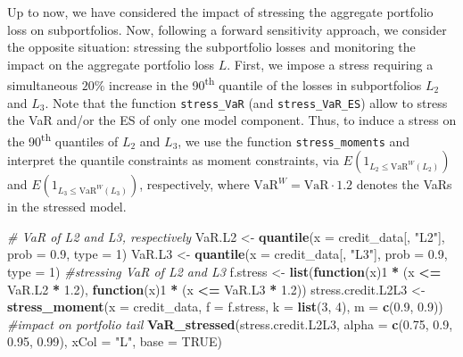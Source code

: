\documentclass[
]{article}
\newenvironment{Shaded}{\begin{snugshade}}{\end{snugshade}}
\newcommand{\CommentTok}[1]{\textcolor[rgb]{0.56,0.35,0.01}{\textit{#1}}}
\newcommand{\ControlFlowTok}[1]{\textcolor[rgb]{0.13,0.29,0.53}{\textbf{#1}}}
\newcommand{\DataTypeTok}[1]{\textcolor[rgb]{0.13,0.29,0.53}{#1}}
\newcommand{\DecValTok}[1]{\textcolor[rgb]{0.00,0.00,0.81}{#1}}
\newcommand{\FloatTok}[1]{\textcolor[rgb]{0.00,0.00,0.81}{#1}}
\newcommand{\KeywordTok}[1]{\textcolor[rgb]{0.13,0.29,0.53}{\textbf{#1}}}
\newcommand{\NormalTok}[1]{#1}
\newcommand{\OperatorTok}[1]{\textcolor[rgb]{0.81,0.36,0.00}{\textbf{#1}}}
\newcommand{\OtherTok}[1]{\textcolor[rgb]{0.56,0.35,0.01}{#1}}
\newcommand{\StringTok}[1]{\textcolor[rgb]{0.31,0.60,0.02}{#1}}
\begin{document}
Up to now, we have considered the impact of stressing the aggregate portfolio loss on subportfolios. Now, following a forward sensitivity approach, we consider the opposite situation: stressing the subportfolio losses and monitoring the impact on the aggregate portfolio loss \(L\). First, we impose a stress requiring a simultaneous \(20\%\) increase in the 90\textsuperscript{th} quantile of the losses in subportfolios \(L_2\) and \(L_3\). Note that the function \texttt{stress\_VaR} (and \texttt{stress\_VaR\_ES}) allow to stress the VaR and/or the ES of only one model component. Thus, to induce a stress on the 90\textsuperscript{th} quantiles of \(L_2\) and \(L_3\), we use the function \texttt{stress\_moments} and interpret the quantile constraints as moment constraints, via \(E(1_{L_2 \leq \text{VaR}^W(L_2)})\) and \(E(1_{L_3 \leq \text{VaR}^W(L_3)})\), respectively, where \(\text{VaR}^W = \text{VaR} \cdot 1.2\) denotes the VaRs in the stressed model.

\begin{Shaded}
\begin{Highlighting}[]
\CommentTok{\# VaR of L2 and L3, respectively}
\NormalTok{VaR.L2 \textless{}{-}}\StringTok{ }\KeywordTok{quantile}\NormalTok{(}\DataTypeTok{x =}\NormalTok{ credit\_data[, }\StringTok{"L2"}\NormalTok{], }\DataTypeTok{prob =} \FloatTok{0.9}\NormalTok{, }\DataTypeTok{type =} \DecValTok{1}\NormalTok{) }
\NormalTok{VaR.L3 \textless{}{-}}\StringTok{ }\KeywordTok{quantile}\NormalTok{(}\DataTypeTok{x =}\NormalTok{ credit\_data[, }\StringTok{"L3"}\NormalTok{], }\DataTypeTok{prob =} \FloatTok{0.9}\NormalTok{, }\DataTypeTok{type =} \DecValTok{1}\NormalTok{) }
\CommentTok{\#stressing VaR of L2 and L3}
\NormalTok{f.stress \textless{}{-}}\StringTok{ }\KeywordTok{list}\NormalTok{(}\ControlFlowTok{function}\NormalTok{(x)}\DecValTok{1} \OperatorTok{*}\StringTok{ }\NormalTok{(x }\OperatorTok{\textless{}=}\StringTok{ }\NormalTok{VaR.L2 }\OperatorTok{*}\StringTok{ }\FloatTok{1.2}\NormalTok{), }
                 \ControlFlowTok{function}\NormalTok{(x)}\DecValTok{1} \OperatorTok{*}\StringTok{ }\NormalTok{(x }\OperatorTok{\textless{}=}\StringTok{ }\NormalTok{VaR.L3 }\OperatorTok{*}\StringTok{ }\FloatTok{1.2}\NormalTok{)) }
\NormalTok{stress.credit.L2L3 \textless{}{-}}\StringTok{ }\KeywordTok{stress\_moment}\NormalTok{(}\DataTypeTok{x =}\NormalTok{ credit\_data, }\DataTypeTok{f =}\NormalTok{ f.stress, }\DataTypeTok{k =} \KeywordTok{list}\NormalTok{(}\DecValTok{3}\NormalTok{, }\DecValTok{4}\NormalTok{), }
                                    \DataTypeTok{m =} \KeywordTok{c}\NormalTok{(}\FloatTok{0.9}\NormalTok{, }\FloatTok{0.9}\NormalTok{))}
\CommentTok{\#impact on portfolio tail}
\KeywordTok{VaR\_stressed}\NormalTok{(stress.credit.L2L3, }\DataTypeTok{alpha =} \KeywordTok{c}\NormalTok{(}\FloatTok{0.75}\NormalTok{, }\FloatTok{0.9}\NormalTok{, }\FloatTok{0.95}\NormalTok{, }\FloatTok{0.99}\NormalTok{), }\DataTypeTok{xCol =} \StringTok{"L"}\NormalTok{, }
             \DataTypeTok{base =} \OtherTok{TRUE}\NormalTok{)}
\end{Highlighting}
\end{Shaded}
\end{document}
